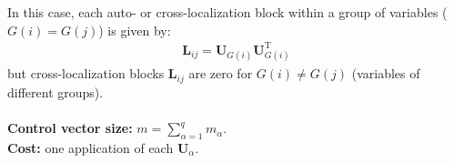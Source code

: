 \documentclass[12pt]{scrartcl}
\begin{document}
In this case, each auto- or cross-localization block within a group of variables ($G(i) = G(j)$) is given by: 
\begin{align}
\mathbf{L}_{ij} = \mathbf{U}_{G(i)} \mathbf{U}_{G(i)}^\mathrm{T}
\end{align}
but cross-localization blocks $\mathbf{L}_{ij}$ are zero for $G(i) \ne G(j)$ (variables of different groups).\\
$  $\\
\textbf{Control vector size:} $\displaystyle m = \sum_{\alpha=1}^q m_\alpha$.\\
\textbf{Cost:} one application of each $\mathbf{U}_\alpha$.

\clearpage



\end{document}
